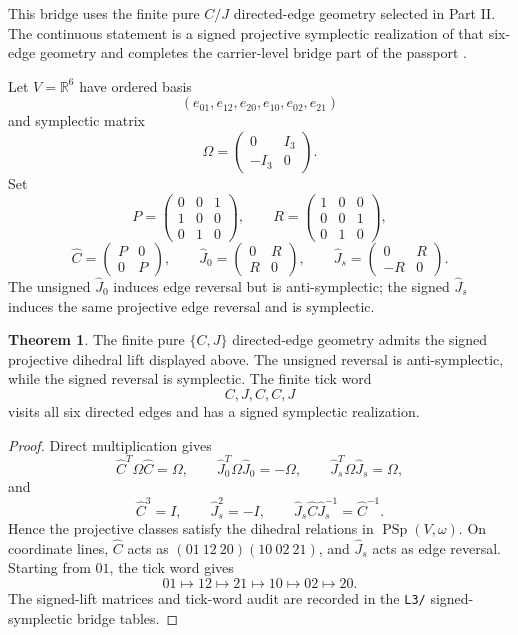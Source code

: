\documentclass[11pt]{article}
\theoremstyle{definition}
\newtheorem{theorem}{Theorem}[section]
\begin{document}
This bridge uses the finite pure \(C/J\) directed-edge geometry selected in
Part II.  The continuous statement is a signed projective symplectic
realization of that six-edge geometry and completes the carrier-level bridge
part of the passport \cite{McDuffSalamon2017}.

Let \(V=\mathbb R^6\) have ordered basis
\[
(e_{01},e_{12},e_{20},e_{10},e_{02},e_{21})
\]
and symplectic matrix
\[
\Omega=
\begin{pmatrix}0&I_3\\-I_3&0\end{pmatrix}.
\]
Set
\[
P=\begin{pmatrix}0&0&1\\1&0&0\\0&1&0\end{pmatrix},
\qquad
R=\begin{pmatrix}1&0&0\\0&0&1\\0&1&0\end{pmatrix},
\]
\[
\widehat C=\begin{pmatrix}P&0\\0&P\end{pmatrix},
\qquad
\widehat J_0=\begin{pmatrix}0&R\\R&0\end{pmatrix},
\qquad
\widehat J_s=\begin{pmatrix}0&R\\-R&0\end{pmatrix}.
\]
The unsigned \(\widehat J_0\) induces edge reversal but is
anti-symplectic; the signed \(\widehat J_s\) induces the same projective
edge reversal and is symplectic.

\begin{theorem}
\label{thm:20.1}
The finite pure \(\{C,J\}\) directed-edge geometry admits the signed
projective dihedral lift displayed above.  The unsigned reversal is
anti-symplectic, while the signed reversal is symplectic.  The finite tick
word
\[
C,J,C,C,J
\]
visits all six directed edges and has a signed symplectic realization.
\end{theorem}

\begin{proof}
Direct multiplication gives
\[
\widehat C^T\Omega\widehat C=\Omega,
\qquad
\widehat J_0^T\Omega\widehat J_0=-\Omega,
\qquad
\widehat J_s^T\Omega\widehat J_s=\Omega,
\]
and
\[
\widehat C^3=I,
\qquad
\widehat J_s^2=-I,
\qquad
\widehat J_s\widehat C\widehat J_s^{-1}=\widehat C^{-1}.
\]
Hence the projective classes satisfy the dihedral relations in
\(\operatorname{PSp}(V,\omega)\).  On coordinate lines, \(\widehat C\)
acts as \((01\ 12\ 20)(10\ 02\ 21)\), and \(\widehat J_s\) acts as edge
reversal.  Starting from \(01\), the tick word gives
\[
01\mapsto12\mapsto21\mapsto10\mapsto02\mapsto20.
\]
The signed-lift matrices and tick-word audit are recorded in the
\texttt{L3/} signed-symplectic bridge tables.
\end{proof}
\end{document}
